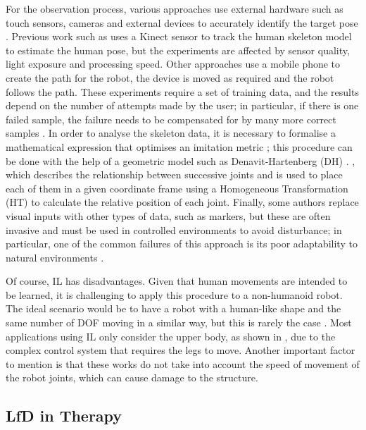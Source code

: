 \documentclass[thesis]{mas_proposal}
\begin{document}
    For the observation process, various approaches use external hardware such as touch sensors, cameras and external devices to accurately identify the target pose \cite{Hua2021}. Previous work such as \cite{Itauma2012, Liu2015} uses a Kinect sensor to track the human skeleton model to estimate the human pose, but the experiments are affected by sensor quality, light exposure and processing speed. Other approaches use a mobile phone to create the path for the robot, the device is moved as required and the robot follows the path. These experiments require a set of training data, and the results depend on the number of attempts made by the user; in particular, if there is one failed sample, the failure needs to be compensated for by many more correct samples \cite{Mandlekar2018}. In order to analyse the skeleton data, it is necessary to formalise a mathematical expression that optimises an imitation metric \cite{Billard2004}; this procedure can be done with the help of a geometric model such as Denavit-Hartenberg (DH) \cite{Fadli2018}. \cite{Assad2020} \cite{VanPerre2015}, which describes the relationship between successive joints and is used to place each of them in a given coordinate frame using a Homogeneous Transformation (HT) to calculate the relative position of each joint. Finally, some authors replace visual inputs with other types of data, such as markers, but these are often invasive and must be used in controlled environments to avoid disturbance; in particular, one of the common failures of this approach is its poor adaptability to natural environments \cite{Mohammad2009, Dillmann2004}.
    
    Of course, IL has disadvantages. Given that human movements are intended to be learned, it is challenging to apply this procedure to a non-humanoid robot. The ideal scenario would be to have a robot with a human-like shape and the same number of DOF moving in a similar way, but this is rarely the case \cite{Ravichandar2020}. Most applications using IL only consider the upper body, as shown in \cite{VanPerre2015}, due to the complex control system that requires the legs to move. Another important factor to mention is that these works do not take into account the speed of movement of the robot joints, which can cause damage to the structure. 
    
    \subsection{LfD in Therapy}
    
\end{document}
